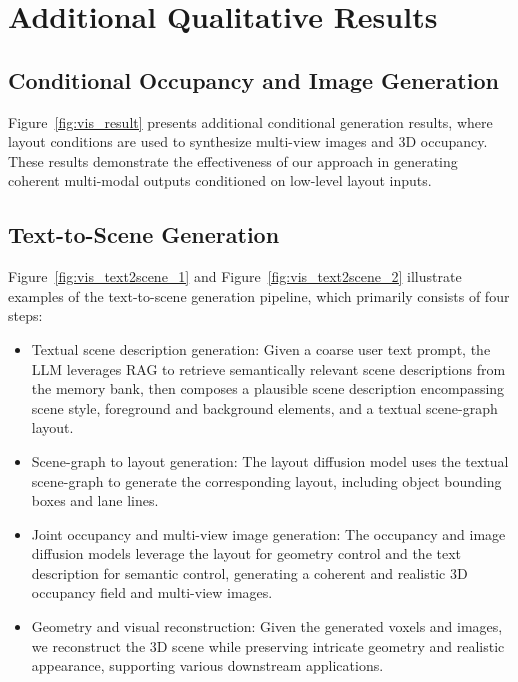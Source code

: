 \clearpage
\section{Additional Qualitative Results}

\subsection{Conditional Occupancy and Image Generation}
Figure~\ref{fig:vis_result} presents additional conditional generation results, where layout conditions are used to synthesize multi-view images and 3D occupancy. These results demonstrate the effectiveness of our approach in generating coherent multi-modal outputs conditioned on low-level layout inputs. 
\vspace{-.5em}






\clearpage
\subsection{Text-to-Scene Generation}
Figure~\ref{fig:vis_text2scene_1} and Figure~\ref{fig:vis_text2scene_2} illustrate examples of the text-to-scene generation pipeline, which primarily consists of four steps:
\begin{itemize}
[align=right,itemindent=0em,labelsep=2pt,labelwidth=1em,leftmargin=*,itemsep=0em] 
\item Textual scene description generation: Given a coarse user text prompt, the LLM leverages RAG to retrieve semantically relevant scene descriptions from the memory bank, then composes a plausible scene description encompassing scene style, foreground and background elements, and a textual scene-graph layout.
\item Scene-graph to layout generation: The layout diffusion model uses the textual scene-graph to generate the corresponding layout, including object bounding boxes and lane lines.
\item Joint occupancy and multi-view image generation: The occupancy and image diffusion models leverage the layout for geometry control and the text description for semantic control, generating a coherent and realistic 3D occupancy field and multi-view images.
\item Geometry and visual reconstruction: Given the generated voxels and images, we reconstruct the 3D scene while preserving intricate geometry and realistic appearance, supporting various downstream applications.
\end{itemize}

